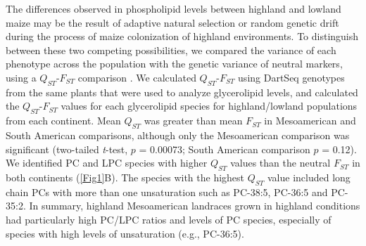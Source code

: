 \documentclass[9pt,twocolumn,twoside,lineno]{biorxiv}
\begin{document}
The differences observed in phospholipid levels between highland and lowland maize may be the result of adaptive natural selection or random genetic drift during the process of maize colonization of highland environments.
To distinguish between these two competing possibilities, we compared the variance of each phenotype across the population with the genetic variance of neutral markers, using a $Q_{ST}$-$F_{ST}$ comparison \cite{Leinonen2013-ic}.
We calculated $Q_{ST}$-$F_{ST}$ using DartSeq genotypes from the same plants that were used to analyze glycerolipid levels, and calculated the $Q_{ST}$-$F_{ST}$ values for each glycerolipid species for highland/lowland populations from each continent. 
Mean $Q_{ST}$ was greater than mean $F_{ST}$ in Mesoamerican and South American comparisons, although only the Mesoamerican comparison was significant (two-tailed \textit{t}-test, $p$ = 0.00073; South American comparison $p$ = 0.12).
We identified PC and LPC species with higher $Q_{ST}$ values than the neutral $F_{ST}$ in both continents  (\cref{Fig1}B).
The species with the highest $Q_{ST}$ value included long chain PCs with more than one unsaturation such as PC-38:5, PC-36:5 and PC-35:2.
In summary, highland Mesoamerican landraces grown in highland conditions had particularly high PC/LPC ratios and levels of PC species, especially of species with high levels of unsaturation (e.g., PC-36:5).
\end{document}
